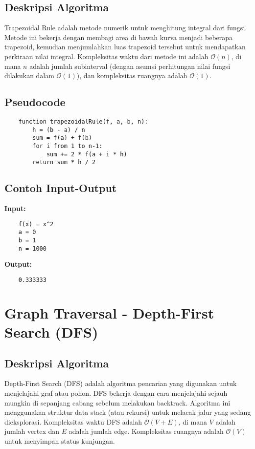 \subsection{Deskripsi Algoritma}
Trapezoidal Rule adalah metode numerik untuk menghitung integral dari fungsi. Metode ini bekerja dengan membagi area di bawah kurva menjadi beberapa trapezoid, kemudian menjumlahkan luas trapezoid tersebut untuk mendapatkan perkiraan nilai integral. Kompleksitas waktu dari metode ini adalah $\mathcal{O}(n)$, di mana $n$ adalah jumlah subinterval (dengan asumsi perhitungan nilai fungsi dilakukan dalam $\mathcal{O}(1)$), dan kompleksitas ruangnya adalah $\mathcal{O}(1)$.

\subsection{Pseudocode}
\begin{verbatim}
    function trapezoidalRule(f, a, b, n):
        h = (b - a) / n
        sum = f(a) + f(b)
        for i from 1 to n-1:
            sum += 2 * f(a + i * h)
        return sum * h / 2
\end{verbatim}

\subsection{Contoh Input-Output}
\textbf{Input:}
\begin{verbatim}
    f(x) = x^2
    a = 0
    b = 1
    n = 1000
\end{verbatim}

\textbf{Output:}
\begin{verbatim}
    0.333333
\end{verbatim}

\section{Graph Traversal - Depth-First Search (DFS)}
\label{sec:dfs-implementation}

\subsection{Deskripsi Algoritma}
Depth-First Search (DFS) adalah algoritma pencarian yang digunakan untuk menjelajahi graf atau pohon. DFS bekerja dengan cara menjelajahi sejauh mungkin di sepanjang cabang sebelum melakukan backtrack. Algoritma ini menggunakan struktur data stack (atau rekursi) untuk melacak jalur yang sedang dieksplorasi. Kompleksitas waktu DFS adalah $\mathcal{O}\left(V + E\right)$, di mana $V$ adalah jumlah vertex dan $E$ adalah jumlah edge. Kompleksitas ruangnya adalah $\mathcal{O}\left(V\right)$ untuk menyimpan status kunjungan.

